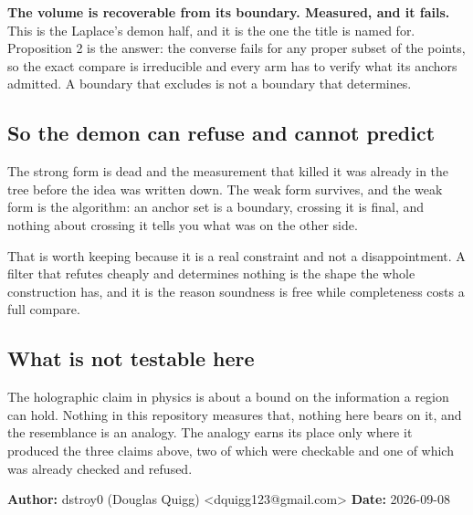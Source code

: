 \textbf{The volume is recoverable from its boundary. Measured, and it fails.} This is the Laplace's demon half, and it is the one the title is named for. Proposition 2 is the answer: the converse fails for any proper subset of the points, so the exact compare is irreducible and every arm has to verify what its anchors admitted. A boundary that excludes is not a boundary that determines.

\subsection{So the demon can refuse and cannot predict}

The strong form is dead and the measurement that killed it was already in the tree before the idea was written down. The weak form survives, and the weak form is the algorithm: an anchor set is a boundary, crossing it is final, and nothing about crossing it tells you what was on the other side.

That is worth keeping because it is a real constraint and not a disappointment. A filter that refutes cheaply and determines nothing is the shape the whole construction has, and it is the reason soundness is free while completeness costs a full compare.

\subsection{What is not testable here}

The holographic claim in physics is about a bound on the information a region can hold. Nothing in this repository measures that, nothing here bears on it, and the resemblance is an analogy. The analogy earns its place only where it produced the three claims above, two of which were checkable and one of which was already checked and refused.

\textbf{Author:} dstroy0 (Douglas Quigg) <dquigg123@gmail.com> \textbf{Date:} 2026-09-08


